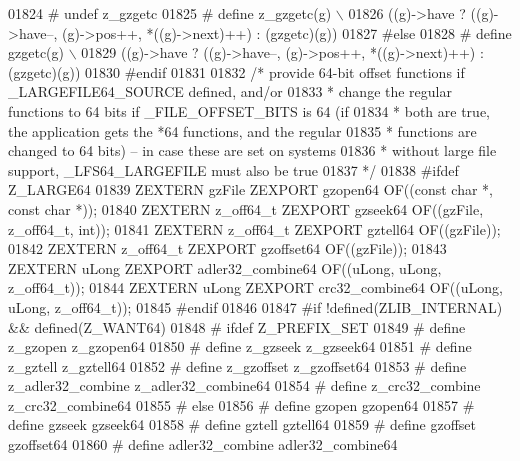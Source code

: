 \begin{DoxyCode}
01824 \textcolor{preprocessor}{#  undef z\_gzgetc}
01825 \textcolor{preprocessor}{#  define z\_gzgetc(g) \(\backslash\)}
01826 \textcolor{preprocessor}{          ((g)->have ? ((g)->have--, (g)->pos++, *((g)->next)++) : (gzgetc)(g))}
01827 \textcolor{preprocessor}{#else}
01828 \textcolor{preprocessor}{#  define gzgetc(g) \(\backslash\)}
01829 \textcolor{preprocessor}{          ((g)->have ? ((g)->have--, (g)->pos++, *((g)->next)++) : (gzgetc)(g))}
01830 \textcolor{preprocessor}{#endif}
01831 
01832 \textcolor{comment}{/* provide 64-bit offset functions if \_LARGEFILE64\_SOURCE defined, and/or}
01833 \textcolor{comment}{ * change the regular functions to 64 bits if \_FILE\_OFFSET\_BITS is 64 (if}
01834 \textcolor{comment}{ * both are true, the application gets the *64 functions, and the regular}
01835 \textcolor{comment}{ * functions are changed to 64 bits) -- in case these are set on systems}
01836 \textcolor{comment}{ * without large file support, \_LFS64\_LARGEFILE must also be true}
01837 \textcolor{comment}{ */}
01838 \textcolor{preprocessor}{#ifdef Z\_LARGE64}
01839    ZEXTERN gzFile ZEXPORT gzopen64 OF((\textcolor{keyword}{const} \textcolor{keywordtype}{char} *, \textcolor{keyword}{const} \textcolor{keywordtype}{char} *));
01840    ZEXTERN z\_off64\_t ZEXPORT gzseek64 OF((gzFile, z\_off64\_t, \textcolor{keywordtype}{int}));
01841    ZEXTERN z\_off64\_t ZEXPORT gztell64 OF((gzFile));
01842    ZEXTERN z\_off64\_t ZEXPORT gzoffset64 OF((gzFile));
01843    ZEXTERN uLong ZEXPORT adler32\_combine64 OF((uLong, uLong, z\_off64\_t));
01844    ZEXTERN uLong ZEXPORT crc32\_combine64 OF((uLong, uLong, z\_off64\_t));
01845 \textcolor{preprocessor}{#endif}
01846 
01847 \textcolor{preprocessor}{#if !defined(ZLIB\_INTERNAL) && defined(Z\_WANT64)}
01848 \textcolor{preprocessor}{#  ifdef Z\_PREFIX\_SET}
01849 \textcolor{preprocessor}{#    define z\_gzopen z\_gzopen64}
01850 \textcolor{preprocessor}{#    define z\_gzseek z\_gzseek64}
01851 \textcolor{preprocessor}{#    define z\_gztell z\_gztell64}
01852 \textcolor{preprocessor}{#    define z\_gzoffset z\_gzoffset64}
01853 \textcolor{preprocessor}{#    define z\_adler32\_combine z\_adler32\_combine64}
01854 \textcolor{preprocessor}{#    define z\_crc32\_combine z\_crc32\_combine64}
01855 \textcolor{preprocessor}{#  else}
01856 \textcolor{preprocessor}{#    define gzopen gzopen64}
01857 \textcolor{preprocessor}{#    define gzseek gzseek64}
01858 \textcolor{preprocessor}{#    define gztell gztell64}
01859 \textcolor{preprocessor}{#    define gzoffset gzoffset64}
01860 \textcolor{preprocessor}{#    define adler32\_combine adler32\_combine64}

\end{DoxyCode}

